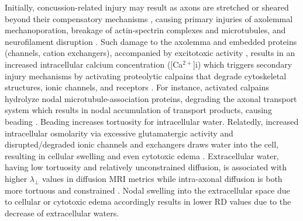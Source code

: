 \documentclass[]{imag-ms-template}
\begin{document}
Initially, concussion-related injury may result as axons are stretched or sheared beyond their compensatory mechanisms \parencite[e.g. spectrin elongation;][]{dubey2020AxonalActinspectrinLattice}, causing primary injuries of axolemmal mechanoporation, breakage of actin-spectrin complexes and microtubules, and neurofilament disruption \parencite{christman1994UltrastructuralStudiesDiffuse,povlishock1997ImpactAccelerationInjury,pettus1996CharacterizationDistinctSet}. Such damage to the axolemma and embedded proteins (channels, cation exchangers), accompanied by excitotoxic activity \parencite{baracaldo-santamaria2022RevisitingExcitotoxicityTraumatic}, results in an increased intracellular calcium concentration ([Ca$^{2+}$]i) which triggers secondary injury mechanisms by activating proteolytic calpains that degrade cytoskeletal structures, ionic channels, and receptors \parencite{krieg2023IdentifyingPhenotypesDiffuse}. For instance, activated calpains hydrolyze nodal microtubule-association proteins, degrading the axonal transport system which results in nodal accumulation of transport products, causing beading \parencite[i.e. varicosities, when stained for $\beta$-amyloid precursor protein;][]{ma2013RoleCalpainsInjuryinduced,johnson2013AxonalPathologyTraumatic,shin2020AxonalTransportDysfunction}. Beading increases tortuosity for intracellular water. Relatedly, increased intracellular osmolarity via excessive glutamatergic activity and disrupted/degraded ionic channels and exchangers draws water into the cell, resulting in cellular swelling and even cytotoxic edema \parencite{rungta2015CellularMechanismsNeuronal,liang2007CytotoxicEdemaMechanisms,baracaldo-santamaria2022RevisitingExcitotoxicityTraumatic}. Extracellular water, having low tortuosity and relatively unconstrained diffusion, is associated with higher $\lambda_\perp$ values in diffusion MRI metrics while intra-axonal diffusion is both more tortuous and constrained \parencite{mayer2010ProspectiveDiffusionTensor,rosenblum2007CytotoxicEdemaMonitoring,winklewski2018UnderstandingPhysiopathologyAxial}. Nodal swelling into the extracellular space due to cellular or cytotoxic edema accordingly results in lower RD values due to the decrease of extracellular waters.
\end{document}
